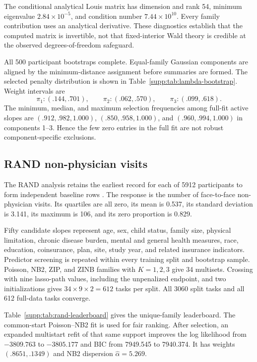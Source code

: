 \documentclass[a4paper,fleqn]{cas-sc}
\numberwithin{equation}{section}
\begin{document}
The conditional analytical Louis matrix has dimension and rank 54, minimum eigenvalue $2.84\times10^{-5}$, and condition number $7.44\times10^{10}$. Every family contribution uses an analytical derivative. These diagnostics establish that the computed matrix is invertible, not that fixed-interior Wald theory is credible at the observed degrees-of-freedom safeguard.

All 500 participant bootstraps complete. Equal-family Gaussian components are aligned by the minimum-distance assignment before summaries are formed. The selected penalty distribution is shown in Table~\ref{supp:tab:lambda-bootstrap}. Weight intervals are
\[
 \pi_1:(.144,.701),\qquad \pi_2:(.062,.570),\qquad
 \pi_3:(.099,.618).
\]
The minimum, median, and maximum selection frequencies among full-fit active slopes are $(.912,.982,1.000)$, $(.850,.958,1.000)$, and $(.960,.994,1.000)$ in components 1--3. Hence the few zero entries in the full fit are not robust component-specific exclusions.

\subsection{RAND non-physician visits}

The RAND analysis retains the earliest record for each of 5912 participants to form independent baseline rows \citep{deb2002health,cameron2005microeconometrics}. The response is the number of face-to-face non-physician visits. Its quartiles are all zero, its mean is 0.537, its standard deviation is 3.141, its maximum is 106, and its zero proportion is 0.829.

Fifty candidate slopes represent age, sex, child status, family size, physical limitation, chronic disease burden, mental and general health measures, race, education, coinsurance, plan, site, study year, and related insurance indicators. Predictor screening is repeated within every training split and bootstrap sample. Poisson, NB2, ZIP, and ZINB families with $K=1,2,3$ give 34 multisets. Crossing with nine lasso-path values, including the unpenalized endpoint, and two initializations gives $34\times9\times2=612$ tasks per split. All 3060 split tasks and all 612 full-data tasks converge.

Table~\ref{supp:tab:rand-leaderboard} gives the unique-family leaderboard. The common-start Poisson--NB2 fit is used for fair ranking. After selection, an expanded multistart refit of that same support improves the log likelihood from $-3809.763$ to $-3805.177$ and BIC from 7949.545 to 7940.374. It has weights $(.8651,.1349)$ and NB2 dispersion $\widehat\alpha=5.269$.
\end{document}
